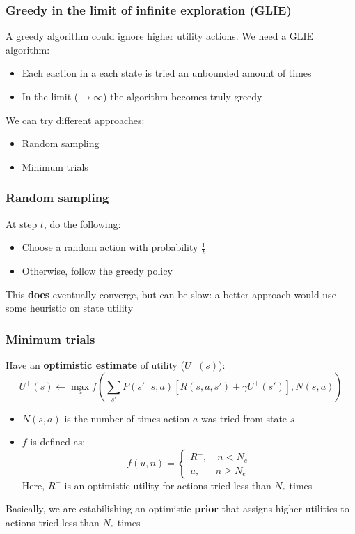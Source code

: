 \documentclass{beamer}
\begin{document}
\begin{frame}
	\frametitle{Greedy in the limit of infinite exploration (GLIE)}
	A greedy algorithm could ignore higher utility actions.
	We need a GLIE algorithm:
	\begin{itemize}
		\item Each eaction in a each state is tried an unbounded amount of times
		\item In the limit ($\rightarrow \infty$) the algorithm becomes truly greedy
	\end{itemize}
	\pause 
	We can try different approaches:
	\begin{itemize}
		\item<1-> Random sampling
		\item<2-> Minimum trials
	\end{itemize}
\end{frame}

\begin{frame}
	\frametitle{Random sampling}
	At step $t$, do the following:
	\begin{itemize}
		\item Choose a random action with probability $\frac{1}{t}$
		\item Otherwise, follow the greedy policy
	\end{itemize}
	This \textbf{does} eventually converge, but can be slow: a better approach would use some heuristic on state utility
\end{frame}

\begin{frame}
	\frametitle{Minimum trials}
	Have an \textbf{optimistic estimate} of utility ($U^+(s)$):
	$$
	U^+(s) \leftarrow \max_a f \left( \sum_{s'} P(s' \, | \, s, a) \left[ R(s, a, s') + \gamma U^+(s') \right], N(s, a) \right)	
	$$
	\begin{itemize}
		\item $N(s,a)$ is the number of times action $a$ was tried from state $s$
		\item $f$ is defined as:
			$$
				f(u, n) = 
				\begin{cases}
					R^+, \quad n < N_e \\ 
					u, \quad \ \ \, n \geq N_e
				\end{cases}
			$$
			Here, $R^+$ is an optimistic utility for actions tried less than $N_e$ times
	\end{itemize}
	Basically, we are estabilishing an optimistic \textbf{prior} that assigns higher utilities to actions tried less than $N_e$ times
\end{frame}
\end{document}
